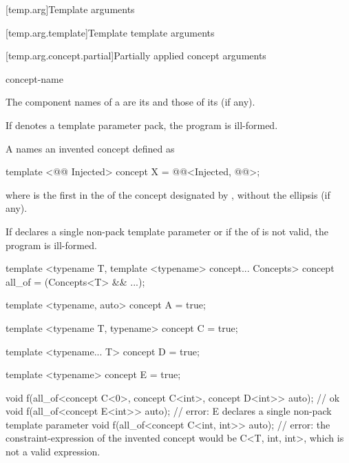 \documentclass{wg21}
\begin{document}
[temp.arg]{Template arguments}

[temp.arg.template]{Template template arguments}


\begin{addedblock}

[temp.arg.concept.partial]{Partially applied concept arguments}


\begin{bnf}
    \br
      concept-name \terminal{<}  \terminal{>}
\end{bnf}


\pnum
The component names of a  are
its  and
those of its  (if any).

If  denotes a template parameter pack, the program is ill-formed.

A  names an invented concept  defined as

\begin{codeblock}
template <@@ Injected>
concept X = @@<Injected, @@>;
\end{codeblock}

where  is the first  in the   of the concept designated by , without the ellipsis (if any).

If  declares a single non-pack template parameter or if the  of  is not valid, the program is ill-formed.

\begin{example}
\begin{colorblock}
template <typename T, template <typename> concept... Concepts>
concept all_of  = (Concepts<T> && ...);

template <typename, auto>
concept A = true;

template <typename T, typename>
concept C = true;

template <typename... T>
concept D = true;

template <typename>
concept E = true;

void f(all_of<concept C<0>, concept C<int>, concept D<int>> auto); // ok
void f(all_of<concept E<int>> auto); // error: E declares a single non-pack template parameter
void f(all_of<concept C<int, int>> auto); // error: the constraint-expression of the invented concept would be C<T, int, int>, which is not a valid expression.

\end{colorblock}
\end{example}

\end{addedblock}
\end{document}
